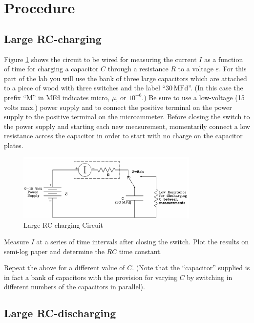 \section{Procedure}

\subsection{Large RC-charging}

Figure \ref{fig:largerccharge} shows the circuit to be wired for measuring the current $I$ as a function of time for charging a capacitor $C$ through a resistance $R$ to a voltage $\varepsilon$. For this part of the lab you will use the bank of three large capacitors which are attached to a piece of wood with three switches and the label ``$30\,\mathrm{MFd}$''. (In this case the prefix ``M'' in MFd indicates micro, $\mu$, or $10^{-6}$.) Be sure to use a low-voltage (15 volts max.) power supply and to connect the positive terminal on the power supply to the positive terminal on the microammeter. Before closing the switch to the power supply and starting each new measurement, momentarily connect a low resistance across the capacitor in order to start with no charge on the capacitor plates.\myskip
\begin{figure}[h]
    \begin{center}
        \includegraphics[width=0.8\textwidth]{./Exp3/pic/image6.png}
    \end{center}
    \caption{Large RC-charging Circuit}
    \label{fig:largerccharge}
\end{figure}

Measure $I$ at a series of time intervals after closing the switch. Plot the results on semi-log paper and determine the $RC$ time constant.\myskip

Repeat the above for a different value of $C$. (Note that the ``capacitor'' supplied is in fact a bank of capacitors with the provision for varying $C$ by switching in different numbers of the capacitors in parallel).

\subsection{Large RC-discharging}

